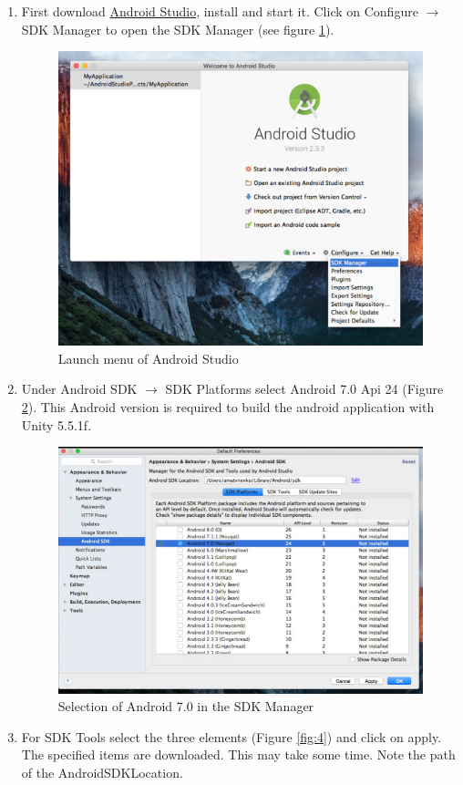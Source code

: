 \documentclass[../../Installationguide_Unity_Pupil]{subfiles}
\begin{document}
\begin{enumerate}
\item First download \href{https://developer.android.com/studio/index.html}{Android Studio}, install and start it.
Click  on Configure $\rightarrow$ SDK Manager to open the SDK Manager (see figure \ref{fig:1}).
\begin{figure}[htb]
	\centering
	\includegraphics[width=0.75\linewidth]{img/1}
	\caption{Launch menu of Android Studio}
	\label{fig:1}
\end{figure}
\item Under Android SDK $\rightarrow$ SDK Platforms select  Android 7.0 Api 24  (Figure \ref{fig:3}). This Android version is required to build the android application with Unity 5.5.1f.
\begin{figure}[htb]
	\centering
	\includegraphics[width=0.95\linewidth]{img/3}
	\caption{Selection of Android 7.0 in the SDK Manager}
	\label{fig:3}
\end{figure}
\item For SDK Tools select the three elements (Figure \ref{fig:4}) and click on apply. The specified items are downloaded. This may take some time. Note the path of the AndroidSDKLocation. 

\end{enumerate}
\end{document}
